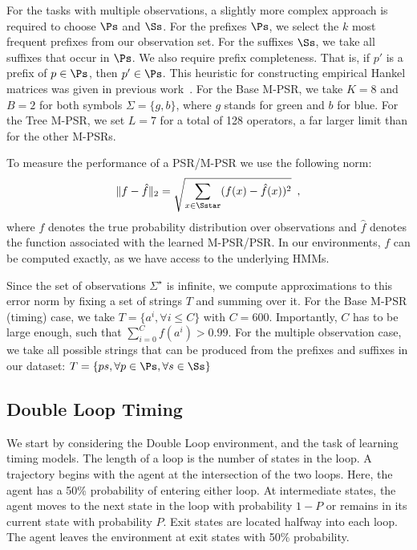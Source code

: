 For the tasks with multiple observations, a slightly more complex approach is required to choose $\Ps$ and $\Ss$. For the prefixes $\Ps$, we select the $k$ most frequent prefixes from our observation set. For the suffixes $\Ss$, we take all suffixes that occur in $\Ps$. We also require prefix completeness. That is, if $p'$ is a prefix of $p \in \Ps$, then $p' \in \Ps$. This heuristic for constructing empirical Hankel matrices was given in previous work~\cite{icml12}. For the Base M-PSR, we take $K=8$ and $B=2$ for both symbols $\Sigma=\{g,b\}$, where $g$ stands for green and $b$ for blue. For the Tree M-PSR, we set $L=7$ for a total of 128 operators, a far larger limit  than for the other M-PSRs. 


To measure the performance of a PSR/M-PSR we use the following norm:
\begin{equation*}
\|f - \hat{f}\|_2 = \sqrt{\sum_{x \in \Sstar}(f(x) - \hat{f}(x))^2} \enspace,
\end{equation*}
where $f$ denotes the true probability distribution over observations and $\hat{f}$ denotes the function associated with the learned M-PSR/PSR. In our environments, $f$ can be computed exactly, as we have access to the underlying HMMs.

Since the set of observations $\Sigma^{\star}$ is infinite, we compute approximations to this error norm by fixing a set of strings $T$ and summing over it. For the Base M-PSR (timing) case, we take $T = \{a^i, \forall i \leq C\}$ with $C=600$. Importantly, $C$ has to be  large enough, such that $\sum_{i=0}^{C} f(a^i)>0.99$. For the multiple observation case, we take all possible strings that can be produced from the prefixes and suffixes in our dataset: $T = \{ps, \forall p \in \Ps, \forall s \in \Ss\} $


\subsection{Double Loop Timing}

We start by considering the Double Loop environment, and the task of learning timing models. The length of a loop is the number of states in the loop. A trajectory begins with the agent at the intersection of the two loops. Here, the agent has a 50\% probability of entering either loop. At intermediate states, the agent moves to the next state in the loop with probability $1-P$ or remains in its current state with probability $P$. Exit states are located halfway into each loop. The agent leaves the environment at exit states with 50\% probability. 


